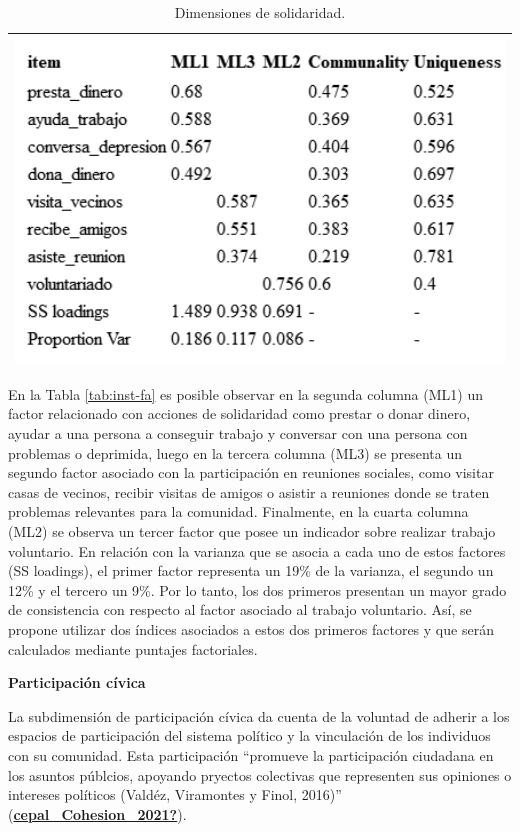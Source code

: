 \documentclass[
  12pt,
]{book}
\begin{document}
\begin{longtable}[]{@{}l@{}}
\caption{\label{tab:solidaridad-fa}Dimensiones de solidaridad.}\tabularnewline
\toprule
\endhead
\includegraphics[width=5.20833in,height=\textheight]{output/tables/solidaridad_fa.png} \\
\bottomrule
\end{longtable}

En la Tabla \ref{tab:inst-fa} es posible observar en la segunda columna (ML1) un factor relacionado con acciones de solidaridad como prestar o donar dinero, ayudar a una persona a conseguir trabajo y conversar con una persona con problemas o deprimida, luego en la tercera columna (ML3) se presenta un segundo factor asociado con la participación en reuniones sociales, como visitar casas de vecinos, recibir visitas de amigos o asistir a reuniones donde se traten problemas relevantes para la comunidad. Finalmente, en la cuarta columna (ML2) se observa un tercer factor que posee un indicador sobre realizar trabajo voluntario. En relación con la varianza que se asocia a cada uno de estos factores (SS loadings), el primer factor representa un 19\% de la varianza, el segundo un 12\% y el tercero un 9\%. Por lo tanto, los dos primeros presentan un mayor grado de consistencia con respecto al factor asociado al trabajo voluntario. Así, se propone utilizar dos índices asociados a estos dos primeros factores y que serán calculados mediante puntajes factoriales.

\textbf{Participación cívica}

La subdimensión de participación cívica da cuenta de la voluntad de adherir a los espacios de participación del sistema político y la vinculación de los individuos con su comunidad. Esta participación ``promueve la participación ciudadana en los asuntos públcios, apoyando pryectos colectivas que representen sus opiniones o intereses políticos (Valdéz, Viramontes y Finol, 2016)'' (\protect\hyperlink{ref-cepal_Cohesion_2021}{\textbf{cepal\_Cohesion\_2021?}}).
\end{document}

